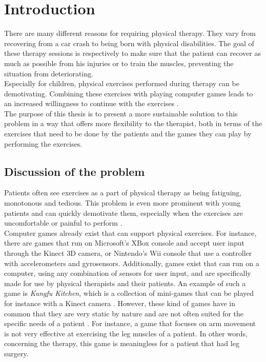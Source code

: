 \chapter{Introduction}

There are many different reasons for requiring physical therapy. They vary from recovering from a car crash to being born with physical disabilities. The goal of these therapy sessions is respectively to make sure that the patient can recover as much as possible from his injuries or to train the muscles, preventing the situation from deteriorating.\\

Especially for children, physical exercises performed during therapy can be demotivating. Combining these exercises with playing computer games leads to an increased willingness to continue with the exercises \cite{Brauner2013}.\\

The purpose of this thesis is to present a more sustainable solution to this problem in a way that offers more flexibility to the therapist, both in terms of the exercises that need to be done by the patients and the games they can play by performing the exercises.


\section{Discussion of the problem}

Patients often see exercises as a part of physical therapy as being fatiguing, monotonous and tedious. This problem is even more prominent with young patients and can quickly demotivate them, especially when the exercises are uncomfortable or painful to perform \cite{Annema2013}.\\

Computer games already exist that can support physical exercises. For instance, there are games that run on Microsoft's XBox console and accept user input through the Kinect 3D camera, or Nintendo's Wii console that use a controller with accelerometers and gyrosensors. Additionally, games exist that can run on a computer, using any combination of sensors for user input, and are specifically made for use by physical therapists and their patients. An example of such a game is \emph{Kungfu Kitchen}, which is a collection of mini-games that can be played for instance with a Kinect camera \cite{KungFuKitchen}. However, these kind of games have in common that they are very static by nature and are not often suited for the specific needs of a patient \cite{Geurts2011}. For instance, a game that focuses on arm movement is not very effective at exercising the leg muscles of a patient. In other words, concerning the therapy, this game is meaningless for a patient that had leg surgery.\\

